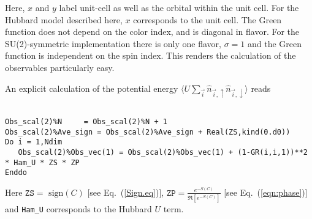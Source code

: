 Here,   $x$ and $y$ label  unit-cell as well as the orbital within the unit cell. For the Hubbard model described here, $x$ corresponds to the unit cell.  The Green function  does not depend on the color index, and is diagonal in flavor.  For the SU(2)-symmetric implementation  there is only one flavor, $\sigma = 1$ and the Green function is  independent on the spin index.  This renders the calculation of the observables particularly easy.   

An explicit calculation of the   potential energy  $ \langle U \sum_{\vec{i}}  \hat{n}_{\vec{i},\uparrow}   \hat{n}_{\vec{i},\downarrow}  \rangle $ reads 

\begin{lstlisting} 

Obs_scal(2)%N     = Obs_scal(2)%N + 1
Obs_scal(2)%Ave_sign = Obs_scal(2)%Ave_sign + Real(ZS,kind(0.d0))
Do i = 1,Ndim
   Obs_scal(2)%Obs_vec(1) = Obs_scal(2)%Obs_vec(1) + (1-GR(i,i,1))**2 * Ham_U * ZS * ZP
Enddo

\end{lstlisting} 
Here  $ \texttt{ZS} = \text{ sign} (C) $  [see Eq.~(\ref{Sign.eq})],  $ \texttt{ZP} =   \frac{e^{-S(C)}} {\Re \left[e^{-S(C)} \right]}   $ [see Eq.~(\ref{eqn:phase})] and  \texttt{Ham\_U}  corresponds to the Hubbard $U$ term.


